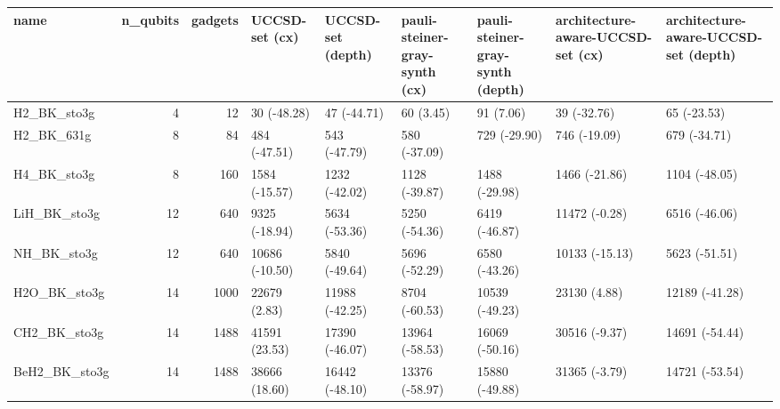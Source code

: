 \begin{tabular}{lrrllllll}
\toprule
name & n\_qubits & gadgets & UCCSD-set (cx) & UCCSD-set (depth) & pauli-steiner-gray-synth (cx) & pauli-steiner-gray-synth (depth) & architecture-aware-UCCSD-set (cx) & architecture-aware-UCCSD-set (depth) \\
\midrule
H2\_BK\_sto3g & 4 & 12 & 30 (-48.28) & 47 (-44.71) & 60 (3.45) & 91 (7.06) & 39 (-32.76) & 65 (-23.53) \\
H2\_BK\_631g & 8 & 84 & 484 (-47.51) & 543 (-47.79) & 580 (-37.09) & 729 (-29.90) & 746 (-19.09) & 679 (-34.71) \\
H4\_BK\_sto3g & 8 & 160 & 1584 (-15.57) & 1232 (-42.02) & 1128 (-39.87) & 1488 (-29.98) & 1466 (-21.86) & 1104 (-48.05) \\
LiH\_BK\_sto3g & 12 & 640 & 9325 (-18.94) & 5634 (-53.36) & 5250 (-54.36) & 6419 (-46.87) & 11472 (-0.28) & 6516 (-46.06) \\
NH\_BK\_sto3g & 12 & 640 & 10686 (-10.50) & 5840 (-49.64) & 5696 (-52.29) & 6580 (-43.26) & 10133 (-15.13) & 5623 (-51.51) \\
H2O\_BK\_sto3g & 14 & 1000 & 22679 (2.83) & 11988 (-42.25) & 8704 (-60.53) & 10539 (-49.23) & 23130 (4.88) & 12189 (-41.28) \\
CH2\_BK\_sto3g & 14 & 1488 & 41591 (23.53) & 17390 (-46.07) & 13964 (-58.53) & 16069 (-50.16) & 30516 (-9.37) & 14691 (-54.44) \\
BeH2\_BK\_sto3g & 14 & 1488 & 38666 (18.60) & 16442 (-48.10) & 13376 (-58.97) & 15880 (-49.88) & 31365 (-3.79) & 14721 (-53.54) \\
\bottomrule
\end{tabular}
